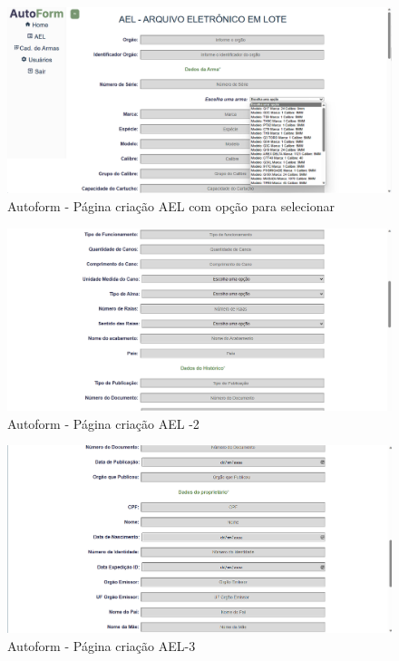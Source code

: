 \begin{figure}[htb]
    \caption{\label{fig:tela-ael-selecao}Autoform - Página criação AEL com opção para selecionar}
    \begin{center}
        \includegraphics[scale=0.5]{imagens/autoform-ael-selecao.png}
    \end{center}
\end{figure}

\begin{figure}[htb]
    \caption{\label{fig:tela-ael2}Autoform - Página criação AEL -2}
    \begin{center}
        \includegraphics[scale=0.5]{imagens/autoform-ael-gerar2.png}
    \end{center}
\end{figure}
\begin{figure}[htb]
    \caption{\label{fig:tela-ael3}Autoform - Página criação AEL-3}
    \begin{center}
        \includegraphics[scale=0.5]{imagens/autoform-ael-gerar3.png}
    \end{center}
\end{figure}

